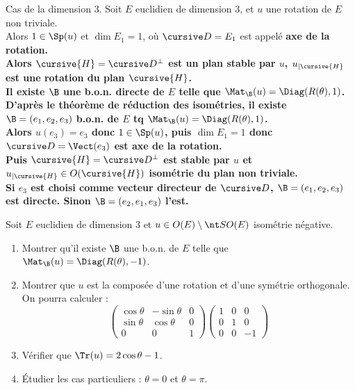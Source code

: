 \documentclass[11pt]{article}
\begin{document}
\begin{prop}{Cas de la dimension 3.}{}
    Soit $E$ euclidien de dimension 3, et $u$ une rotation de $E$ non triviale.\\
    Alors $1\in\Sp(u)$ et $\dim E_1 = 1$, où $\D=E_1$ est appelé \bf{axe de la rotation}.\\
    Alors $\cursive{H}=\D^\bot$ est un plan stable par $u$, $u_{|\cursive{H}}$ est une rotation du plan $\cursive{H}$.\\
    Il existe $\B$ une b.o.n. directe de $E$ telle que $\Mat_\B(u)=\Diag(R(\theta),1)$.
    \tcblower
    D'après le théorème de réduction des isométries, il existe $\B=(e_1,e_2,e_3)$ b.o.n. de $E$ tq $\Mat_\B(u)=\Diag(R(\theta),1)$.\\
    Alors $u(e_3)=e_3$ donc $1\in\Sp(u)$, puis $\dim E_1=1$ donc $\D=\Vect(e_3)$ est axe de la rotation.\\
    Puis $\cursive{H}=\D^\bot$ est stable par $u$ et $u_{|\cursive{H}}\in O(\cursive{H})$ isométrie du plan non triviale.\\
    Si $e_3$ est choisi comme vecteur directeur de $\D$, $\B=(e_1,e_2,e_3)$ est directe. Sinon $\B=(e_2,e_1,e_3)$ l'est. 
\end{prop}

\begin{exercice}{}{}
    Soit $E$ euclidien de dimension 3 et $u\in O(E) \setminus \SO(E)$ isométrie négative.
    \begin{enumerate}
        \item Montrer qu'il existe $\B$ une b.o.n. de $E$ telle que $\Mat_\B(u)=\Diag(R(\theta),-1)$.
        \item Montrer que $u$ est la composée d'une rotation et d'une symétrie orthogonale. On pourra calculer :
        \begin{equation*}
            \begin{pmatrix}\cos\theta&-\sin\theta&0\\\sin\theta&\cos\theta&0\\0&0&1\end{pmatrix}\begin{pmatrix}1&0&0\\0&1&0\\0&0&-1\end{pmatrix}
        \end{equation*}
        \item Vérifier que $\Tr(u)=2\cos\theta-1$.
        \item Étudier les cas particuliers  : $\theta=0$ et $\theta=\pi$.
    \end{enumerate}
\end{exercice}
\end{document}

